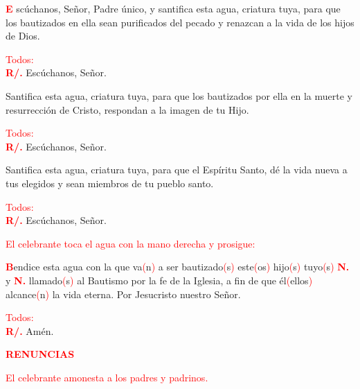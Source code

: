 \documentclass[12pt, letterpaper, spanish]{article}
\begin{document}
  \lettrine[lines=2]{\bfseries \textcolor{red}{E}}{} \Large sc\'uchanos, Se\~nor, Padre \'unico, y santifica esta agua, criatura tuya, para que los bautizados en ella sean purificados del pecado y renazcan a la vida de los hijos de Dios.

  \large {\textcolor{red}{Todos:}}\\
  \Large {\bfseries \textcolor{red}{R/.}} \hspace{0.5cm} Esc\'uchanos, Se\~nor.

  \noindent
  \Large Santifica esta agua, criatura tuya, para que los bautizados por ella en la muerte y resurrecci\'on de Cristo, respondan a la imagen de tu Hijo.

  \large {\textcolor{red}{Todos:}}\\
  \Large {\bfseries \textcolor{red}{R/.}} \hspace{0.5cm} Esc\'uchanos, Se\~nor.

  \noindent
  \Large Santifica esta agua, criatura tuya, para que el Esp\'iritu Santo, d\'e la vida nueva a tus elegidos y sean miembros de tu pueblo santo.

  \large {\textcolor{red}{Todos:}}\\
  \Large {\bfseries \textcolor{red}{R/.}} \hspace{0.5cm} Esc\'uchanos, Se\~nor.

  \large {\textcolor{red}{El celebrante toca el agua con la mano derecha y prosigue:}}
  
  \lettrine[lines=2]{\bfseries \textcolor{red}{B}}{}\Large endice \Huge{\textcolor{red}{}} \Large esta agua con la que va\textcolor{red}{(}n\textcolor{red}{)} a ser bautizado\textcolor{red}{(}s\textcolor{red}{)} este\textcolor{red}{(}os\textcolor{red}{)} hijo\textcolor{red}{(}s\textcolor{red}{)} tuyo\textcolor{red}{(}s\textcolor{red}{)} {\bfseries \textcolor{red}{N.}} y {\bfseries \textcolor{red}{N.}} llamado\textcolor{red}{(}s\textcolor{red}{)} al Bautismo por la fe de la Iglesia, a fin de que \'el\textcolor{red}{(}ellos\textcolor{red}{)} alcance\textcolor{red}{(}n\textcolor{red}{)} la vida eterna. Por Jesucristo nuestro Se\~nor.

  \large {\textcolor{red}{Todos:}}\\
  \Large {\bfseries \textcolor{red}{R/.}} \hspace{0.5cm} Am\'en.

  \Large {\bfseries \textcolor{red}{RENUNCIAS}}

  \large {\textcolor{red}{El celebrante amonesta a los padres y padrinos.}}
\end{document}
